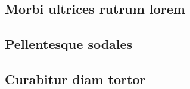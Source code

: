 \documentclass[
	12pt,				%
    oneside,            %
	a4paper,			%
	english,			%
	brazilian,		    %
	]{AcademicoUFT}
\begin{document}
\begin{anexosenv}
\partanexos %

\chapter{Morbi ultrices rutrum lorem}

\section{Pellentesque sodales}
\lipsum[40-41] %

\section{Curabitur diam tortor}
\lipsum[54-55] %

\end{anexosenv}
\end{document}
